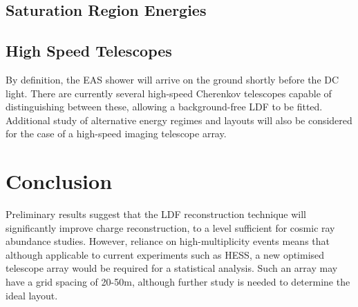 \documentclass{article}
\begin{document}
\subsection{Saturation Region Energies}

\subsection{High Speed Telescopes}
By definition, the EAS shower will arrive on the ground shortly before the DC light. There are currently several high-speed Cherenkov telescopes capable of distinguishing between these, allowing a background-free LDF to be fitted. Additional study of alternative energy regimes and layouts will also be considered for the case of a high-speed imaging telescope array. 

\section{Conclusion}
Preliminary results suggest that the LDF reconstruction technique will significantly improve charge reconstruction, to a level sufficient for cosmic ray abundance studies. However, reliance on high-multiplicity events means that although applicable to current experiments such as HESS, a new optimised telescope array would be required for a statistical analysis. Such an array may have a grid spacing of 20-50m, although further study is needed to determine the ideal layout.


\end{document}
